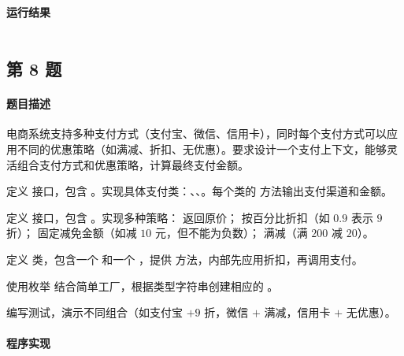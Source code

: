 \documentclass{academics}
\begin{document}
\paragraph{运行结果} {
    \inputminted{text}{../res/P07.out}
}

\subsection{第 8 题}

\paragraph{题目描述} {
    电商系统支持多种支付方式（支付宝、微信、信用卡），同时每个支付方式可以应用不同的优惠策略（如满减、折扣、无优惠）。要求设计一个支付上下文，能够灵活组合支付方式和优惠策略，计算最终支付金额。

    定义  接口，包含 。实现具体支付类：、、。每个类的  方法输出支付渠道和金额。

    定义  接口，包含 。实现多种策略： 返回原价； 按百分比折扣（如 $0.9$ 表示 $9$ 折）； 固定减免金额（如减 $10$ 元，但不能为负数）； 满减（满 $200$ 减 $20$）。

    定义  类，包含一个  和一个 ，提供  方法，内部先应用折扣，再调用支付。

    使用枚举  结合简单工厂，根据类型字符串创建相应的 。

    编写测试，演示不同组合（如支付宝 $+ 9$ 折，微信 $+$ 满减，信用卡 $+$ 无优惠）。
}

\paragraph{程序实现} {
    \inputminted[label=PaymentMethod.java]{java}{../src/P08/PaymentMethod.java}
    \inputminted[label=Alipay.java]{java}{../src/P08/Alipay.java}
    \inputminted[label=WechatPay.java]{java}{../src/P08/WechatPay.java}
    \inputminted[label=CreditCard.java]{java}{../src/P08/CreditCard.java}
    \inputminted[label=DiscountStrategy.java]{java}{../src/P08/DiscountStrategy.java}
    \inputminted[label=NoDiscountStrategy.java]{java}{../src/P08/NoDiscountStrategy.java}
    \inputminted[label=PercentageDiscountStrategy.java]{java}{../src/P08/PercentageDiscountStrategy.java}
    \inputminted[label=FixedAmountDiscountStrategy.java]{java}{../src/P08/FixedAmountDiscountStrategy.java}
    \inputminted[label=ThresholdDiscountStrategy.java]{java}{../src/P08/ThresholdDiscountStrategy.java}
    \inputminted[label=DiscountType.java]{java}{../src/P08/DiscountType.java}
    \inputminted[label=PaymentContext.java]{java}{../src/P08/PaymentContext.java}
    \inputminted[label=PaymentTest.java]{java}{../src/P08/PaymentTest.java}
}
\end{document}
